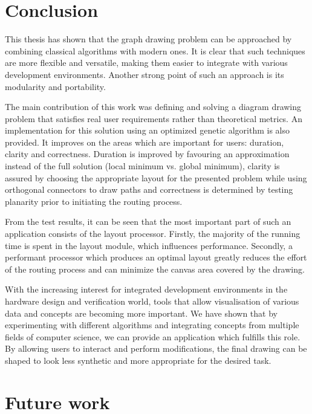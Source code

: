 \section{Conclusion}

This thesis has shown that the graph drawing problem can be approached by combining classical algorithms 
with modern ones. It is clear that such techniques are more flexible and versatile, making them easier 
to integrate with various development environments. Another strong point of such an approach is 
its modularity and portability.

The main contribution of this work was defining and solving a diagram drawing problem that satisfies 
real user requirements rather than theoretical metrics. An implementation for this solution using an optimized 
genetic algorithm is also provided. It improves on the areas which are important for users: duration, clarity and 
correctness. Duration is improved by favouring an approximation instead of the full solution (local minimum 
vs. global minimum), clarity is assured by choosing the appropriate layout for the presented problem while 
using orthogonal connectors to draw paths and correctness is determined by testing planarity prior to initiating 
the routing process.

From the test results, it can be seen that the most important part of such an application consists of the 
layout processor. Firstly, the majority of the running time is spent in the layout module, which 
influences performance. Secondly, a performant processor which produces an optimal layout greatly 
reduces the effort of the routing process and can minimize the canvas area covered by the drawing.

With the increasing interest for integrated development environments in the hardware design and 
verification world, tools that allow visualisation of various data and concepts are becoming 
more important. We have shown that by experimenting with different algorithms and integrating 
concepts from multiple fields of computer science, we can provide an application which fulfills this role. 
By allowing users to interact and perform modifications, the final drawing can be shaped to look 
less synthetic and more appropriate for the desired task.

\section{Future work}

